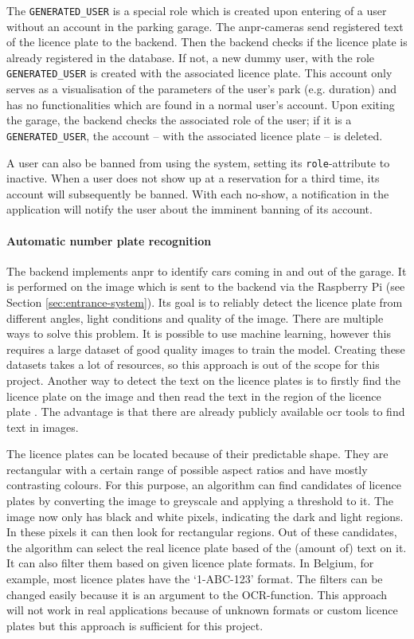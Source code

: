 \ind The \verb|GENERATED_USER| is a special role which is created upon entering of a user without an account in the parking garage. The \ac{anpr}-cameras send registered text of the licence plate to the backend. Then the backend checks if the licence plate is already registered in the database. If not, a new dummy user, with the role \verb|GENERATED_USER| is created with the associated licence plate. This account only serves as a visualisation of the parameters of the user's park (e.g. duration) and has no functionalities which are found in a normal user's account. Upon exiting the garage, the backend checks the associated role of the user; if it is a \verb|GENERATED_USER|, the account -- with the associated licence plate -- is deleted.

\ind A user can also be banned from using the system, setting its \texttt{role}-attribute to inactive. When a user does not show up at a reservation for a third time, its account will subsequently be banned. With each no-show, a notification in the application will notify the user about the imminent banning of its account.

\paragraph{Automatic number plate recognition}\label{sec:anpr}
The backend implements \ac{anpr} to identify cars coming in and out of the garage. It is performed on the image which is sent to the backend via the Raspberry Pi (see Section \ref{sec:entrance-system}). Its goal is to reliably detect the licence plate from different angles, light conditions and quality of the image. There are multiple ways to solve this problem. It is possible to use machine learning, however this requires a large dataset of good quality images to train the model. Creating these datasets takes a lot of resources, so this approach is out of the scope for this project. Another way to detect the text on the licence plates is to firstly find the licence plate on the image and then read the text in the region of the licence plate \cite{anpr}. The advantage is that there are already publicly available \ac{ocr} tools to find text in images. 

\ind The licence plates can be located because of their predictable shape. They are rectangular with a certain range of possible aspect ratios and have mostly contrasting colours. For this purpose, an algorithm can find candidates of licence plates by converting the image to greyscale and applying a threshold to it. The image now only has black and white pixels, indicating the dark and light regions. In these pixels it can then look for rectangular regions. Out of these candidates, the algorithm can select the real licence plate based of the (amount of) text on it. It can also filter them based on given licence plate formats. In Belgium, for example, most licence plates have the `1-ABC-123' format. The filters can be changed easily because it is an argument to the OCR-function. This approach will not work in real applications because of unknown formats or custom licence plates but this approach is sufficient for this project.

